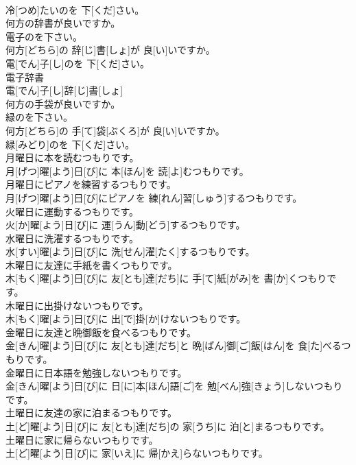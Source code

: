 \documentclass[8pt]{extreport}
\begin{document}
\begin{CJK}{UTF8}{min}
\\	冷[つめ]たいのを 下[くだ]さい。
\\	何方の辞書が良いですか。 
\\	電子のを下さい。	
\\	何方[どちら]の 辞[じ]書[しょ]が 良[い]いですか。 
\\	電[でん]子[し]のを 下[くだ]さい。
\\	電子辞書	
\\	電[でん]子[し]辞[じ]書[しょ]	
\\	何方の手袋が良いですか。 
\\	緑のを下さい。	
\\	何方[どちら]の 手[て]袋[ぶくろ]が 良[い]いですか。 
\\	緑[みどり]のを 下[くだ]さい。
\\	月曜日に本を読むつもりです。	
\\	月[げつ]曜[よう]日[び]に 本[ほん]を 読[よ]むつもりです。
\\	月曜日にピアノを練習するつもりです。	
\\	月[げつ]曜[よう]日[び]にピアノを 練[れん]習[しゅう]するつもりです。
\\	火曜日に運動するつもりです。	
\\	火[か]曜[よう]日[び]に 運[うん]動[どう]するつもりです。
\\	水曜日に洗濯するつもりです。	
\\	水[すい]曜[よう]日[び]に 洗[せん]濯[たく]するつもりです。
\\	木曜日に友達に手紙を書くつもりです。	
\\	木[もく]曜[よう]日[び]に 友[とも]達[だち]に 手[て]紙[がみ]を 書[か]くつもりです。
\\	木曜日に出掛けないつもりです。	
\\	木[もく]曜[よう]日[び]に 出[で]掛[か]けないつもりです。
\\	金曜日に友達と晩御飯を食べるつもりです。	
\\	金[きん]曜[よう]日[び]に 友[とも]達[だち]と 晩[ばん]御[ご]飯[はん]を 食[た]べるつもりです。
\\	金曜日に日本語を勉強しないつもりです。	
\\	金[きん]曜[よう]日[び]に 日[に]本[ほん]語[ご]を 勉[べん]強[きょう]しないつもりです。
\\	土曜日に友達の家に泊まるつもりです。	
\\	土[ど]曜[よう]日[び]に 友[とも]達[だち]の 家[うち]に 泊[と]まるつもりです。
\\	土曜日に家に帰らないつもりです。	
\\	土[ど]曜[よう]日[び]に 家[いえ]に 帰[かえ]らないつもりです。

\end{CJK}
\end{document}
